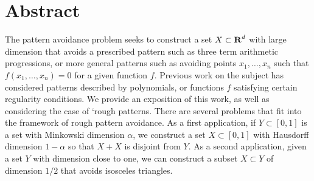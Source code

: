 
\chapter{Abstract}


The pattern avoidance problem seeks to construct a set $X \subset \operatorname{\mathbf{R}}^d$ with large dimension that avoids a prescribed pattern such as three term arithmetic progressions, or more general patterns such as avoiding points $x_1, \dots, x_n$ such that $f(x_1, \dots, x_n) = 0$ for a given function $f$. Previous work on the subject has considered patterns described by polynomials, or functions $f$ satisfying certain regularity conditions. We provide an exposition of this work, as well as considering the case of `rough patterns. There are several problems that fit into the framework of rough pattern avoidance. As a first application, if $Y\subset[0,1]$ is a set with Minkowski dimension $\alpha$, we construct a set $X\subset[0,1]$ with Hausdorff dimension $1-\alpha$ so that $X+X$ is disjoint from $Y$. As a second application, given a set $Y$ with dimension close to one, we can construct a subset $X\subset Y$ of dimension $1/2$ that avoids isosceles triangles.